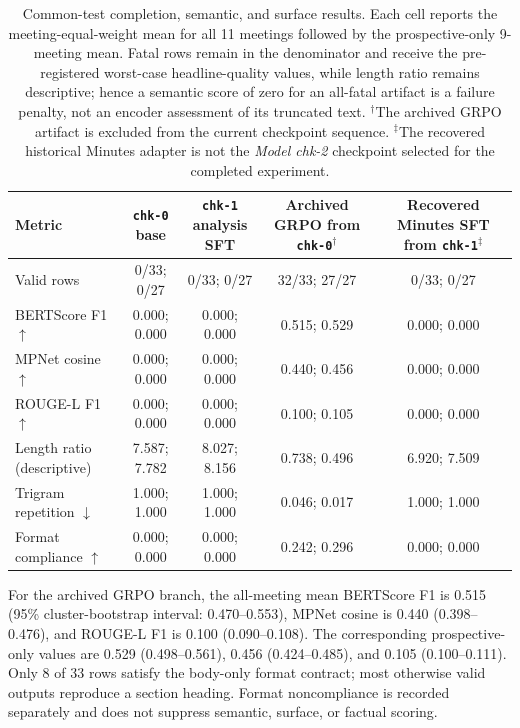 \begin{table}[htbp]
    \centering
    \scriptsize
    \begin{tabular}{p{} c c c c}
        \toprule
        \textbf{Metric} &
        \makecell[c]{\texttt{chk-0}\\base} &
        \makecell[c]{\texttt{chk-1}\\analysis SFT} &
        \makecell[c]{Archived GRPO\\from \texttt{chk-0}$^{\dagger}$} &
        \makecell[c]{Recovered Minutes SFT\\from \texttt{chk-1}$^{\ddagger}$} \\
        \midrule
        Valid rows & 0/33; 0/27 & 0/33; 0/27 & 32/33; 27/27 & 0/33; 0/27 \\
        BERTScore F1 $\uparrow$ & 0.000; 0.000 & 0.000; 0.000 & 0.515; 0.529 & 0.000; 0.000 \\
        MPNet cosine $\uparrow$ & 0.000; 0.000 & 0.000; 0.000 & 0.440; 0.456 & 0.000; 0.000 \\
        ROUGE-L F1 $\uparrow$ & 0.000; 0.000 & 0.000; 0.000 & 0.100; 0.105 & 0.000; 0.000 \\
        Length ratio (descriptive) & 7.587; 7.782 & 8.027; 8.156 & 0.738; 0.496 & 6.920; 7.509 \\
        Trigram repetition $\downarrow$ & 1.000; 1.000 & 1.000; 1.000 & 0.046; 0.017 & 1.000; 1.000 \\
        Format compliance $\uparrow$ & 0.000; 0.000 & 0.000; 0.000 & 0.242; 0.296 & 0.000; 0.000 \\
        \bottomrule
    \end{tabular}
    \caption{Common-test completion, semantic, and surface results. Each cell
    reports the meeting-equal-weight mean for all 11 meetings followed by the
    prospective-only 9-meeting mean. Fatal rows remain in the denominator and
    receive the pre-registered worst-case headline-quality values, while
    length ratio remains descriptive; hence a semantic score of zero for an
    all-fatal artifact is a failure penalty, not an encoder assessment of its
    truncated text. $^{\dagger}$The archived GRPO artifact is excluded from
    the current checkpoint sequence. $^{\ddagger}$The recovered historical
    Minutes adapter is not the \textit{Model chk-2} checkpoint selected for the
    completed experiment.}
    \label{tab:ch2:common_test_quality}
\end{table}

For the archived GRPO branch, the all-meeting mean BERTScore F1 is 0.515
(95\% cluster-bootstrap interval: 0.470--0.553), MPNet cosine is 0.440
(0.398--0.476), and ROUGE-L F1 is 0.100 (0.090--0.108).  The corresponding
prospective-only values are 0.529 (0.498--0.561), 0.456 (0.424--0.485),
and 0.105 (0.100--0.111).  Only 8 of 33 rows satisfy the body-only format
contract; most otherwise valid outputs reproduce a section heading.  Format
noncompliance is recorded separately and does not suppress semantic,
surface, or factual scoring.

